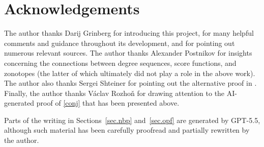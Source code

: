 \documentclass[12pt]{article}
\theoremstyle{definition}
\theoremstyle{remark}
\begin{document}
\section*{Acknowledgements} The author thanks Darij Grinberg for introducing this project, for many helpful comments and guidance throughout its development, and for pointing out numerous relevant sources. The author thanks Alexander Postnikov for insights concerning the connections between degree sequences, score functions, and zonotopes (the latter of which ultimately did not play a role in the above work). The author also thanks Sergei Shteiner for pointing out the alternative proof in \cite{KleitmanWinston}. Finally, the author thanks V\'aclav Rozho\v{n} for drawing attention to the AI-generated proof of \eqref{conj} that has been presented above.

Parts of the writing in Sections~\ref{sec.nbp} and~\ref{sec.opf} are generated by GPT-5.5, although such material has been carefully proofread and partially rewritten by the author.





\nocite{*}

\end{document}
